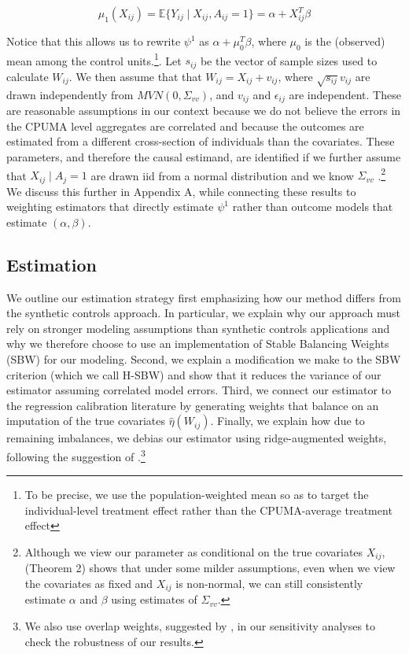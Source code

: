 \documentclass[12pt]{article}
\begin{document}
$$
\mu_1(X_{ij}) = \mathbb{E}\{Y_{ij} \mid X_{ij}, A_{ij} = 1\} = \alpha + X_{ij}^T\beta
$$

Notice that this allows us to rewrite $\psi^1$ as $\alpha + \mu_0^T\beta$, where $\mu_0$ is the (observed) mean among the control units.\footnote{To be precise, we use the population-weighted mean so as to target the individual-level treatment effect rather than the CPUMA-average treatment effect}. Let $s_{ij}$ be the vector of sample sizes used to calculate $W_{ij}$. We then assume that that $W_{ij} = X_{ij} + v_{ij}$, where $\sqrt{s_{ij}}v_{ij}$ are drawn independently from $MVN(0, \Sigma_{vv})$, and $v_{ij}$ and $\epsilon_{ij}$ are independent. These are reasonable assumptions in our context because we do not believe the errors in the CPUMA level aggregates are correlated and because the outcomes are estimated from a different cross-section of individuals than the covariates. These parameters, and therefore the causal estimand, are identified if we further assume that $X_{ij} \mid A_j = 1$ are drawn iid from a normal distribution and we know $\Sigma_{vv}$ \cite{gleser1992importance}.\footnote{Although we view our parameter as conditional on the true covariates $X_{ij}$, \cite{gleser1992importance} (Theorem 2) shows that under some milder assumptions, even when we view the covariates as fixed and $X_{ij}$ is non-normal, we can still consistently estimate $\alpha$ and $\beta$ using estimates of $\Sigma_{vv}$.} We discuss this further in Appendix A, while connecting these results to weighting estimators that directly estimate $\psi^1$ rather than outcome models that estimate $(\alpha, \beta)$. 

\subsection{Estimation}

We outline our estimation strategy first emphasizing how our method differs from the synthetic controls approach. In particular, we explain why our approach must rely on stronger modeling assumptions than synthetic controls applications and why we therefore choose to use an implementation of Stable Balancing Weights (SBW) for our modeling. Second, we explain a modification we make to the SBW criterion (which we call H-SBW) and show that it reduces the variance of our estimator assuming correlated model errors. Third, we connect our estimator to the regression calibration literature by generating weights that balance on an imputation of the true covariates $\hat{\eta}(W_{ij})$. Finally, we explain how due to remaining imbalances, we debias our estimator using ridge-augmented weights, following the suggestion of \cite{ben2018augmented}.\footnote{We also use overlap weights, suggested by \cite{li2018balancing}, in our sensitivity analyses to check the robustness of our results.}
\end{document}
